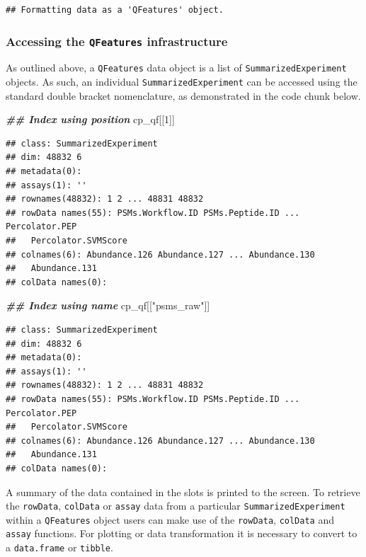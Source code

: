 \documentclass[9pt,a4paper,]{extarticle}
\newenvironment{Shaded}{\begin{snugshade}}{\end{snugshade}}
\newcommand{\DecValTok}[1]{\textcolor[rgb]{0.00,0.00,0.81}{#1}}
\newcommand{\DocumentationTok}[1]{\textcolor[rgb]{0.56,0.35,0.01}{\textbf{\textit{#1}}}}
\newcommand{\NormalTok}[1]{#1}
\newcommand{\StringTok}[1]{\textcolor[rgb]{0.31,0.60,0.02}{#1}}
\begin{document}
\begin{verbatim}
## Formatting data as a 'QFeatures' object.
\end{verbatim}

\subsubsection{\texorpdfstring{Accessing the \texttt{QFeatures} infrastructure}{Accessing the QFeatures infrastructure}}\label{accessing-the-qfeatures-infrastructure}

As outlined above, a \texttt{QFeatures} data object is a list of \texttt{SummarizedExperiment}
objects. As such, an individual \texttt{SummarizedExperiment} can be accessed using
the standard double bracket nomenclature, as demonstrated in the code chunk
below.

\begin{Shaded}
\begin{Highlighting}[]
\DocumentationTok{\#\# Index using position}
\NormalTok{cp\_qf[[}\DecValTok{1}\NormalTok{]]}
\end{Highlighting}
\end{Shaded}

\begin{verbatim}
## class: SummarizedExperiment 
## dim: 48832 6 
## metadata(0):
## assays(1): ''
## rownames(48832): 1 2 ... 48831 48832
## rowData names(55): PSMs.Workflow.ID PSMs.Peptide.ID ... Percolator.PEP
##   Percolator.SVMScore
## colnames(6): Abundance.126 Abundance.127 ... Abundance.130
##   Abundance.131
## colData names(0):
\end{verbatim}

\begin{Shaded}
\begin{Highlighting}[]
\DocumentationTok{\#\# Index using name}
\NormalTok{cp\_qf[[}\StringTok{"psms\_raw"}\NormalTok{]]}
\end{Highlighting}
\end{Shaded}

\begin{verbatim}
## class: SummarizedExperiment 
## dim: 48832 6 
## metadata(0):
## assays(1): ''
## rownames(48832): 1 2 ... 48831 48832
## rowData names(55): PSMs.Workflow.ID PSMs.Peptide.ID ... Percolator.PEP
##   Percolator.SVMScore
## colnames(6): Abundance.126 Abundance.127 ... Abundance.130
##   Abundance.131
## colData names(0):
\end{verbatim}

A summary of the data contained in the slots is printed to the screen.
To retrieve the \texttt{rowData}, \texttt{colData} or \texttt{assay} data from a particular
\texttt{SummarizedExperiment} within a \texttt{QFeatures} object users can make use of the
\texttt{rowData}, \texttt{colData} and \texttt{assay} functions. For plotting or data transformation
it is necessary to convert to a \texttt{data.frame} or \texttt{tibble}.
\end{document}
